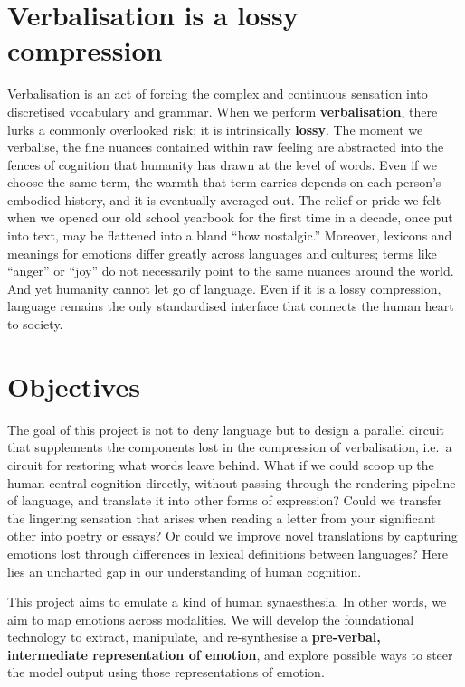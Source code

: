 \documentclass[12pt,twoside]{report}
\begin{document}
\section{Verbalisation is a lossy compression}
Verbalisation is an act of forcing the complex and continuous sensation into discretised vocabulary and grammar. When we perform \textbf{verbalisation}, there lurks a commonly overlooked risk; it is intrinsically \textbf{lossy}. The moment we verbalise, the fine nuances contained within raw feeling are abstracted into the fences of cognition that humanity has drawn at the level of words. Even if we choose the same term, the warmth that term carries depends on each person’s embodied history, and it is eventually averaged out. The relief or pride we felt when we opened our old school yearbook for the first time in a decade, once put into text, may be flattened into a bland ``how nostalgic.'' Moreover, lexicons and meanings for emotions differ greatly across languages and cultures\cite{jackson2019emotion}; terms like ``anger'' or ``joy'' do not necessarily point to the same nuances around the world. And yet humanity cannot let go of language. Even if it is a lossy compression, language remains the only standardised interface that connects the human heart to society.


\section{Objectives}
The goal of this project is not to deny language but to design a parallel circuit that supplements the components lost in the compression of verbalisation, i.e.\ a circuit for restoring what words leave behind. What if we could scoop up the human central cognition directly, without passing through the rendering pipeline of language, and translate it into other forms of expression? Could we transfer the lingering sensation that arises when reading a letter from your significant other into poetry or essays? Or could we improve novel translations by capturing emotions lost through differences in lexical definitions between languages? Here lies an uncharted gap in our understanding of human cognition. 

This project aims to emulate a kind of human synaesthesia. In other words, we aim to map emotions across modalities. We will develop the foundational technology to extract, manipulate, and re-synthesise a \textbf{pre-verbal, intermediate representation of emotion}, and explore possible ways to steer the model output using those representations of emotion.
\end{document}
